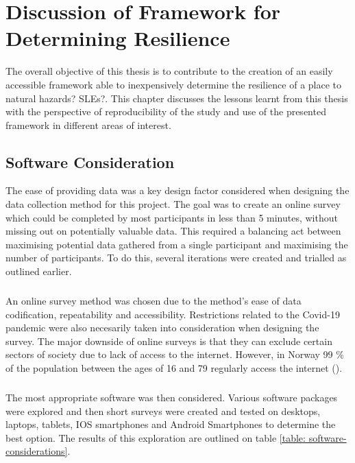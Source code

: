 \chapter{Discussion of Framework for Determining Resilience}\label{discussion-framework}

The overall objective of this thesis is to contribute to the creation of an easily accessible framework able to inexpensively determine the resilience of a place to natural hazards? SLEs?. This chapter discusses the lessons learnt from this thesis with the perspective of reproducibility of the study and use of the presented framework in different areas of interest.

\section{Software Consideration}
The ease of providing data was a key design factor considered when designing the data collection method for this project. The goal was to create an online survey which could be completed by most participants in less than 5 minutes, without missing out on potentially valuable data. This required a balancing act between maximising potential data gathered from a single participant and maximising the number of participants. To do this, several iterations were created and trialled as outlined earlier.
\paragraph{}
An online survey method was chosen due to the method's ease of data codification, repeatability and accessibility. Restrictions related to the Covid-19 pandemic were also necesarily taken into consideration when designing the survey. The major downside of online surveys is that they can exclude certain sectors of society due to lack of access to the internet. However, in Norway 99 \% of the population between the ages of 16 and 79 regularly access the internet (\cite{walther-zhang_ict_2022}). 
\paragraph{}
The most appropriate software was then considered.  Various software packages were explored and then short surveys were created and  tested on desktops, laptops, tablets, IOS smartphones and Android Smartphones to determine the best option. The results of this exploration are outlined on table \ref{table: software-considerations}.

